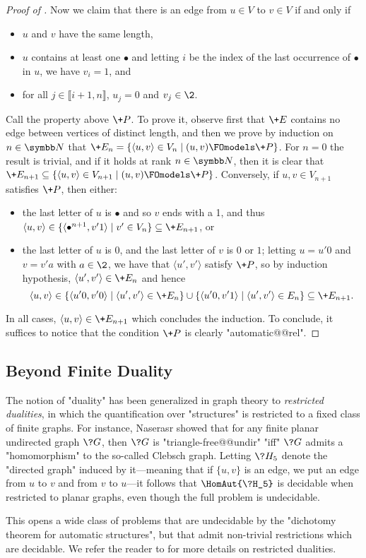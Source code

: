 \begin{proof}[Proof of ]
  Now we claim that there is an edge from $u \in V$ to $v \in V$ if and only if
  \begin{itemize}
    \item $u$ and $v$ have the same length,
    \item $u$ contains at least one $\bullet$
      and letting $i$ be the index of the last occurrence of $\bullet$ in $u$,
      we have $v_i = 1$, and
    \item for all $j \in \lBrack i+1,n\rBrack$, $u_j = 0$
    and $v_j \in \2$.
  \end{itemize}
  Call the property above $\+P$.
  To prove it, observe first that $\+E$ contains no edge
  between vertices of distinct length, and then we prove
  by induction on $n\in\N$ that $\+E_n = \{\langle u,v\rangle \in V_n \mid (u,v) \FOmodels \+P\}$.
  For $n=0$ the result is trivial, and if it holds at rank $n\in\N$,
  then it is clear that $\+E_{n+1} \subseteq
  \{\langle u,v\rangle \in V_{n+1} \mid (u,v) \FOmodels \+P\}$.
  Conversely, if $u,v \in V_{n+1}$ satisfies $\+P$, then
  either:
  \begin{itemize}
    \item the last letter of $u$ is $\bullet$ and so $v$ ends with a
    1, and thus $\langle u,v \rangle \in \{\langle \bullet^{n+1}, v'1\rangle \mid v'\in V_n\}
    \subseteq \+E_{n+1}$, or 
    \item the last letter of $u$ is $0$, and the last letter of $v$ is $0$ or $1$;
      letting $u = u'0$ and $v = v'a$ with $a \in \2$, we have
      that $\langle u', v'\rangle$ satisfy $\+P$, so by induction hypothesis,
      $\langle u', v'\rangle \in \+E_n$ and hence
      \[\langle u,v \rangle \in \{\langle u'0,v'0\rangle \mid \langle u',v'\rangle \in \+E_n\}
      \cup \{\langle u'0,v'1\rangle \mid \langle u',v'\rangle \in E_n\} \subseteq \+E_{n+1}.\]
  \end{itemize}
  In all cases, $\langle u,v\rangle \in \+E_{n+1}$ which concludes the induction.
  To conclude, it suffices to notice that the condition $\+P$ is clearly "automatic@@rel".
\end{proof}


\subsection{Beyond Finite Duality}

The notion of "duality" has been generalized in graph theory to \emph{restricted dualities},  
in which the quantification over "structures" is restricted to a fixed class of finite graphs.
For instance, Naserasr showed \cite[Theorem 11]{Naserasr2007PlanarDuality} that 
for any finite planar undirected graph $\?G$, then $\?G$ is "triangle-free@@undir"
"iff" $\?G$ admits a "homomorphism" to the so-called Clebsch graph.
Letting $\?H_5$ denote the "directed graph" induced by it---meaning that if $\{u,v\}$ is an edge,
we put an edge from $u$ to $v$ and from $v$ to $u$---it follows that
$\HomAut{\?H_5}$ is decidable when restricted to planar graphs,
even though the full problem is undecidable.

This opens a wide class of problems that are undecidable by the "dichotomy theorem for automatic structures", but that admit non-trivial restrictions which are decidable.
We refer the reader to \cite{NesetrilPOM2012RestrictedDualities} for more details on restricted dualities.